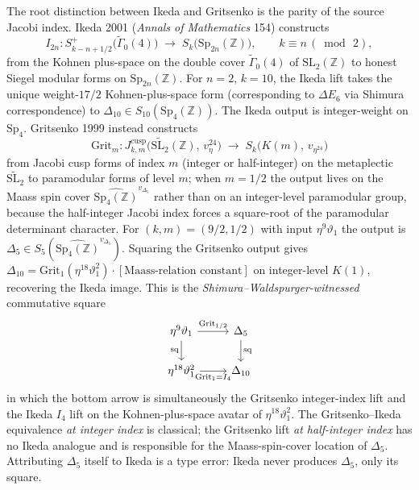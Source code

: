 \begin{remark}
\label{rem:ikeda-gritsenko-disambiguation}
The root distinction between Ikeda and Gritsenko is the parity of the source
Jacobi index. Ikeda 2001 (\emph{Annals of Mathematics} 154) constructs
\[
 I_{2n}\colon
 S^+_{k - n + 1/2}\bigl(\widetilde{\Gamma}_0(4)\bigr)
 \;\longrightarrow\;
 S_k\bigl(\mathrm{Sp}_{2n}(\mathbb{Z})\bigr),
 \qquad
 k\equiv n\,(\bmod\,2),
\]
from the Kohnen plus-space on the double cover $\widetilde{\Gamma}_0(4)$ of
$\mathrm{SL}_2(\mathbb{Z})$ to honest Siegel modular forms on
$\mathrm{Sp}_{2n}(\mathbb{Z})$. For $n = 2$, $k = 10$, the Ikeda lift takes the unique
weight-$17/2$ Kohnen-plus-space form (corresponding to $\Delta E_6$ via Shimura
correspondence) to $\Delta_{10} \in S_{10}(\mathrm{Sp}_4(\mathbb{Z}))$. The Ikeda
output is integer-weight on $\mathrm{Sp}_4$. Gritsenko 1999 instead constructs
\[
 \mathrm{Grit}_m\colon
 J^{\mathrm{cusp}}_{k,m}\bigl(\widetilde{\mathrm{SL}_2}(\mathbb{Z}),\, v_\eta^{24}\bigr)
 \;\longrightarrow\;
 S_k\bigl(K(m),\, v_{\eta^{24}}\bigr)
\]
from Jacobi cusp forms of index $m$ (integer or half-integer) on the metaplectic
$\widetilde{\mathrm{SL}_2}$ to paramodular forms of level $m$; when $m = 1/2$ the
output lives on the Maass spin cover $\widehat{\mathrm{Sp}_4(\mathbb{Z})}^{v_{\Delta_5}}$
rather than on an integer-level paramodular group, because the half-integer Jacobi
index forces a square-root of the paramodular determinant character. For
$(k, m) = (9/2, 1/2)$ with input $\eta^9\vartheta_1$ the output is
$\Delta_5\in S_5(\widehat{\mathrm{Sp}_4(\mathbb{Z})}^{v_{\Delta_5}})$. Squaring
the Gritsenko output gives $\Delta_{10} = \mathrm{Grit}_1(\eta^{18}\vartheta_1^2)
\cdot [\text{Maass-relation constant}]$ on integer-level $K(1)$, recovering the Ikeda
image. This is the \emph{Shimura--Waldspurger-witnessed} commutative square
\[
 \begin{tikzcd}
 \eta^9\vartheta_1
 \arrow[r, "\mathrm{Grit}_{1/2}"] \arrow[d, "\mathrm{sq}"']
 & \Delta_5 \arrow[d, "\mathrm{sq}"] \\
 \eta^{18}\vartheta_1^2
 \arrow[r, "\mathrm{Grit}_1 = I_4"']
 & \Delta_{10}
 \end{tikzcd}
\]
in which the bottom arrow is simultaneously the Gritsenko integer-index lift and the
Ikeda $I_4$ lift on the Kohnen-plus-space avatar of $\eta^{18}\vartheta_1^2$. The
Gritsenko--Ikeda equivalence \emph{at integer index} is classical; the Gritsenko
lift \emph{at half-integer index} has no Ikeda analogue and is responsible for the
Maass-spin-cover location of $\Delta_5$. Attributing $\Delta_5$ itself to Ikeda is a
type error: Ikeda never produces $\Delta_5$, only its square.
\end{remark}

